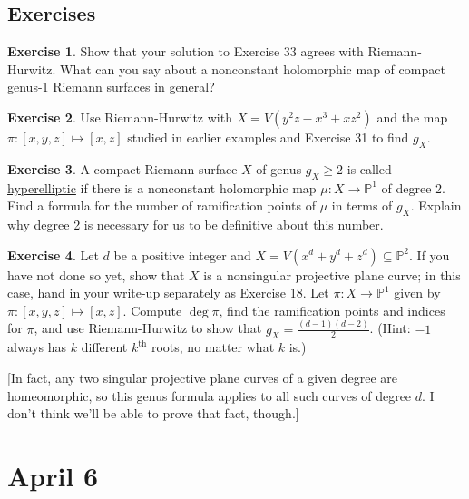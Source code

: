 \documentclass[12pt]{article}
\newcommand{\p}{\mathbb{P}}
\theoremstyle{definition}
\newtheorem{exercise}{Exercise}
\theoremstyle{remark}
\begin{document}
\subsection{Exercises}
\begin{exercise}
    Show that your solution to Exercise 33 agrees with Riemann-Hurwitz. What can you say about a nonconstant holomorphic map of compact genus-1 Riemann surfaces in general?
\end{exercise}
\begin{exercise}
    Use Riemann-Hurwitz with $X = V(y^2z - x^3 + xz^2)$ and the map $\pi : [x,y,z] \mapsto [x,z]$ studied in earlier examples and Exercise 31 to find $g_X$.
\end{exercise}
\begin{exercise}
    A compact Riemann surface $X$ of genus $g_X \geq 2$ is called \underline{hyperelliptic} if there is a nonconstant holomorphic map $\mu : X \to \p^1$ of degree 2. Find a formula for the number of ramification points of $\mu$ in terms of $g_X$. Explain why degree 2 is necessary for us to be definitive about this number.
\end{exercise}
\begin{exercise}
    Let $d$ be a positive integer and $X = V(x^d + y^d + z^d) \subseteq \p^2$. If you have not done so yet, show that $X$ is a nonsingular projective plane curve; in this case, hand in your write-up separately as Exercise 18. Let $\pi : X \to \p^1$ given by $\pi : [x,y,z] \mapsto [x,z]$. Compute $\deg \pi$, find the ramification points and indices for $\pi$, and use Riemann-Hurwitz to show that $g_X = \frac{(d-1)(d-2)}{2}$. (Hint: $-1$ always has $k$ different $k^{\text{th}}$ roots, no matter what $k$ is.)
    
    [In fact, any two singular projective plane curves of a given degree are homeomorphic, so this genus formula applies to all such curves of degree $d$. I don't think we'll be able to prove that fact, though.]
\end{exercise}
\section{April 6}
\end{document}
